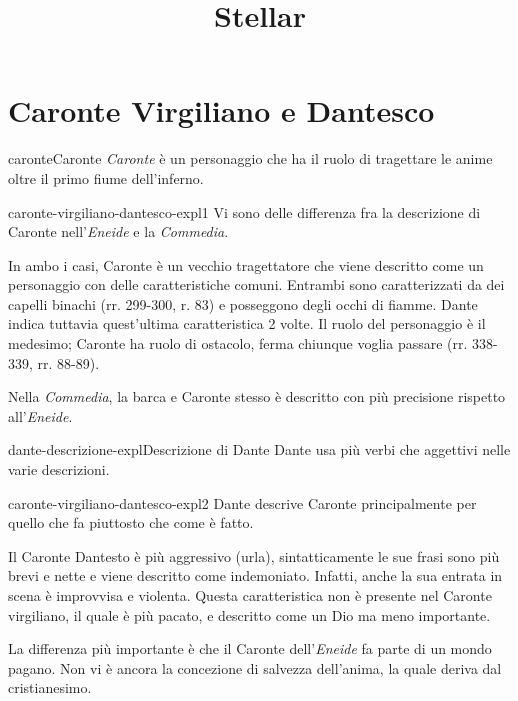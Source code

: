 \documentclass[preview]{standalone}
\begin{document}
\title{Stellar}
\genpage

\section{Caronte Virgiliano e Dantesco}

\begin{snippetcharacter}{caronte}{Caronte}
    \textit{Caronte} è un personaggio che ha il ruolo di tragettare le anime
    oltre il primo fiume dell'inferno.
\end{snippetcharacter}

\begin{snippet}{caronte-virgiliano-dantesco-expl1}
    Vi sono delle differenza fra la descrizione di Caronte nell'\textit{Eneide}
    e la \textit{Commedia}.
    
    In ambo i casi, Caronte è un vecchio tragettatore che viene descritto come un personaggio con
    delle caratteristiche comuni.
    Entrambi sono caratterizzati da dei capelli binachi (rr. 299-300, r. 83) e posseggono
    degli occhi di fiamme. Dante indica tuttavia quest'ultima caratteristica 2 volte.
    Il ruolo del personaggio è il medesimo; Caronte ha ruolo di ostacolo, ferma chiunque voglia passare
    (rr. 338-339, rr. 88-89).
    
    Nella \textit{Commedia}, la barca e Caronte stesso è descritto con più precisione
    rispetto all'\textit{Eneide}.
\end{snippet}

\begin{snippetnote}{dante-descrizione-expl}{Descrizione di Dante}
    Dante usa più verbi che aggettivi nelle varie descrizioni.
\end{snippetnote}

\begin{snippet}{caronte-virgiliano-dantesco-expl2}
    Dante descrive Caronte principalmente per quello che fa piuttosto che come è fatto.
    
    Il Caronte Dantesto è più aggressivo (urla), sintatticamente le sue frasi sono
    più brevi e nette e viene descritto come indemoniato. Infatti, anche la sua entrata in scena
    è improvvisa e violenta. Questa caratteristica non è presente nel Caronte virgiliano,
    il quale è più pacato, e descritto come un Dio ma meno importante.
    
    La differenza più importante è che il Caronte dell'\textit{Eneide} fa parte di un mondo pagano.
    Non vi è ancora la concezione di salvezza dell'anima, la quale deriva dal cristianesimo.
\end{snippet}
\end{document}
